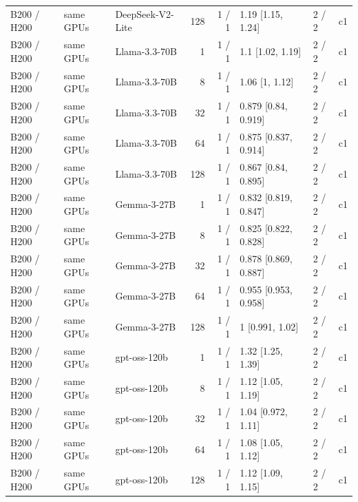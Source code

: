 \begin{longtable}{lllrrlll}
B200 / H200 & same GPUs & DeepSeek-V2-Lite & 128 & 1 / 1 & 1.19 {[}1.15, 1.24{]} & 2 / 2 & c1 \\
B200 / H200 & same GPUs & Llama-3.3-70B & 1 & 1 / 1 & 1.1 {[}1.02, 1.19{]} & 2 / 2 & c1 \\
B200 / H200 & same GPUs & Llama-3.3-70B & 8 & 1 / 1 & 1.06 {[}1, 1.12{]} & 2 / 2 & c1 \\
B200 / H200 & same GPUs & Llama-3.3-70B & 32 & 1 / 1 & 0.879 {[}0.84, 0.919{]} & 2 / 2 & c1 \\
B200 / H200 & same GPUs & Llama-3.3-70B & 64 & 1 / 1 & 0.875 {[}0.837, 0.914{]} & 2 / 2 & c1 \\
B200 / H200 & same GPUs & Llama-3.3-70B & 128 & 1 / 1 & 0.867 {[}0.84, 0.895{]} & 2 / 2 & c1 \\
B200 / H200 & same GPUs & Gemma-3-27B & 1 & 1 / 1 & 0.832 {[}0.819, 0.847{]} & 2 / 2 & c1 \\
B200 / H200 & same GPUs & Gemma-3-27B & 8 & 1 / 1 & 0.825 {[}0.822, 0.828{]} & 2 / 2 & c1 \\
B200 / H200 & same GPUs & Gemma-3-27B & 32 & 1 / 1 & 0.878 {[}0.869, 0.887{]} & 2 / 2 & c1 \\
B200 / H200 & same GPUs & Gemma-3-27B & 64 & 1 / 1 & 0.955 {[}0.953, 0.958{]} & 2 / 2 & c1 \\
B200 / H200 & same GPUs & Gemma-3-27B & 128 & 1 / 1 & 1 {[}0.991, 1.02{]} & 2 / 2 & c1 \\
B200 / H200 & same GPUs & gpt-oss-120b & 1 & 1 / 1 & 1.32 {[}1.25, 1.39{]} & 2 / 2 & c1 \\
B200 / H200 & same GPUs & gpt-oss-120b & 8 & 1 / 1 & 1.12 {[}1.05, 1.19{]} & 2 / 2 & c1 \\
B200 / H200 & same GPUs & gpt-oss-120b & 32 & 1 / 1 & 1.04 {[}0.972, 1.11{]} & 2 / 2 & c1 \\
B200 / H200 & same GPUs & gpt-oss-120b & 64 & 1 / 1 & 1.08 {[}1.05, 1.12{]} & 2 / 2 & c1 \\
B200 / H200 & same GPUs & gpt-oss-120b & 128 & 1 / 1 & 1.12 {[}1.09, 1.15{]} & 2 / 2 & c1 \\
\end{longtable}
\endgroup
